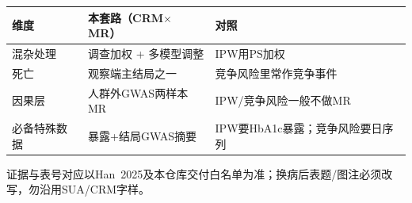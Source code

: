 \documentclass[11pt,a4paper]{article}
\begin{document}
\begin{tabularx}{\textwidth}{@{}L{0.22\textwidth}X X@{}}
\toprule
\textbf{维度} & \textbf{本套路（CRM$\times$MR）} & \textbf{对照} \\
\midrule
混杂处理 & 调查加权 + 多模型调整 & IPW用PS加权 \\
死亡 & 观察端主结局之一 & 竞争风险里常作竞争事件 \\
因果层 & 人群外GWAS两样本MR & IPW/竞争风险一般不做MR \\
必备特殊数据 & 暴露+结局GWAS摘要 & IPW要HbA1c暴露；竞争风险要日序列 \\
\bottomrule
\end{tabularx}

\vspace{1em}
\noindent\small\color{gray!60!black}
证据与表号对应以Han~2025及本仓库交付白名单为准；换病后表题/图注必须改写，勿沿用SUA/CRM字样。
\end{document}
